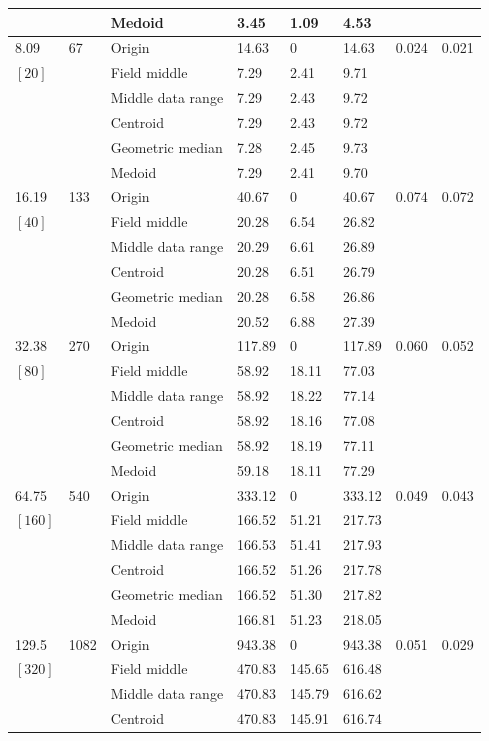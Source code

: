\documentclass[phd,showgrids]{ndsu-thesis-2022}
\begin{document}
{{\begin{ThreePartTable}
\begin{longtable}{lll lll ll}
 &  & Medoid  & 3.45 & 1.09 & 4.53 \\
\midrule
8.09 & 67 & Origin  & 14.63 & 0 & 14.63 & 0.024 & 0.021 \\
$[20]$ &  & Field middle  & 7.29 & 2.41 & 9.71 \\
 &  & Middle data range  & 7.29 & 2.43 & 9.72 \\
 &  & Centroid & 7.29 & 2.43 & 9.72 \\
 &  & Geometric median & 7.28 & 2.45 & 9.73 \\
 &  & Medoid  & 7.29 & 2.41 & 9.70 \\ 
\midrule
16.19 & 133 & Origin  & 40.67 & 0 & 40.67 & 0.074 & 0.072 \\
$[40]$ &  & Field middle  & 20.28 & 6.54 & 26.82 \\
 &  & Middle data range  & 20.29 & 6.61 & 26.89 \\
 &  & Centroid & 20.28 & 6.51 & 26.79 \\
 &  & Geometric median & 20.28 & 6.58 & 26.86 \\
 &  & Medoid  & 20.52 & 6.88 & 27.39 \\
\midrule
32.38 & 270 & Origin  & 117.89 & 0 & 117.89 & 0.060 & 0.052 \\
$[80]$ &  & Field middle  & 58.92 & 18.11 & 77.03 \\
 &  & Middle data range  & 58.92 & 18.22 & 77.14 \\
 &  & Centroid & 58.92 & 18.16 & 77.08 \\
 &  & Geometric median & 58.92 & 18.19 & 77.11 \\
 &  & Medoid  & 59.18 & 18.11 & 77.29 \\
\midrule
64.75 & 540 & Origin  & 333.12 & 0 & 333.12 & 0.049 & 0.043 \\
$[160]$ &  & Field middle  & 166.52 & 51.21 & 217.73 \\
 &  & Middle data range  & 166.53 & 51.41 & 217.93 \\
 &  & Centroid & 166.52 & 51.26 & 217.78 \\
 &  & Geometric median & 166.52 & 51.30 & 217.82 \\
 &  & Medoid  & 166.81 & 51.23 & 218.05 \\
\midrule
129.5 & 1082 & Origin  & 943.38 & 0 & 943.38 & 0.051 & 0.029 \\
$[320]$ &  & Field middle  & 470.83 & 145.65 & 616.48 \\
 &  & Middle data range  & 470.83 & 145.79 & 616.62 \\
 &  & Centroid & 470.83 & 145.91 & 616.74 \\

\end{longtable}
\end{ThreePartTable}}}
\end{document}
